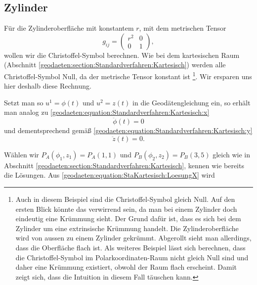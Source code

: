 %
%
%
%
\subsection{Zylinder\label{geodaeten:section:Standardverfahren:Zylinder}}

Für die Zylinderoberfläche mit konstantem $r$, mit dem metrischen Tensor 
\begin{equation}
	g_{ij} = \begin{pmatrix} 
		r^2 & 0 \\ 
		0 & 1 
	\end{pmatrix},
\end{equation}
wollen wir die Christoffel-Symbol berechnen. 
Wie bei dem kartesischen Raum (Abschnitt \ref{geodaeten:section:Standardverfahren:Kartesisch}) werden alle Christoffel-Symbol Null, da der metrische Tensor konstant ist \footnote{
Auch in diesem Beispiel sind die Christoffel-Symbol gleich Null.
Auf den ersten Blick könnte das verwirrend sein, da man bei einem Zylinder doch eindeutig eine Krümmung sieht.
Der Grund dafür ist, dass es sich bei dem Zylinder um eine extrinsische Krümmung handelt.
Die Zylinderoberfläche wird von aussen zu einem Zylinder gekrümmt.
Abgerollt sieht man allerdings, dass die Oberfläche flach ist.
Als weiteres Beispiel lässt sich berechnen, dass die Christoffel-Symbol im Polarkoordinaten-Raum nicht gleich Null sind und daher eine Krümmung existiert, obwohl der Raum flach erscheint.
Damit zeigt sich, dass die Intuition in diesem Fall täuschen kann.
}.
Wir ersparen uns hier deshalb diese Rechnung.

Setzt man so $u^1 = \phi (t)$ und $u^2 = z(t)$ in die Geodätengleichung ein, so erhält man analog zu \eqref{geodaeten:equation:Standardverfahren:Kartesisch:x}
\begin{equation}
	\ddot{\phi}(t) = 0
	\label{geodaeten:equation:Standardverfahren:Zylinder:phi}
\end{equation}
und dementsprechend gemäß \eqref{geodaeten:equation:Standardverfahren:Kartesisch:y}
\begin{equation}
	\ddot{z}(t) = 0 .
\end{equation}

Wählen wir $P_A(\phi_1 , z_1) = P_A(1 , 1)$ und $P_B(\phi_2 , z_2) = P_B(3 , 5)$ gleich wie in Abschnitt \ref{geodaeten:section:Standardverfahren:Kartesisch}, kennen wie bereits die Lösungen. 
Aus \eqref{geodaeten:equation:StaKartesisch:LoesungX} wird 

